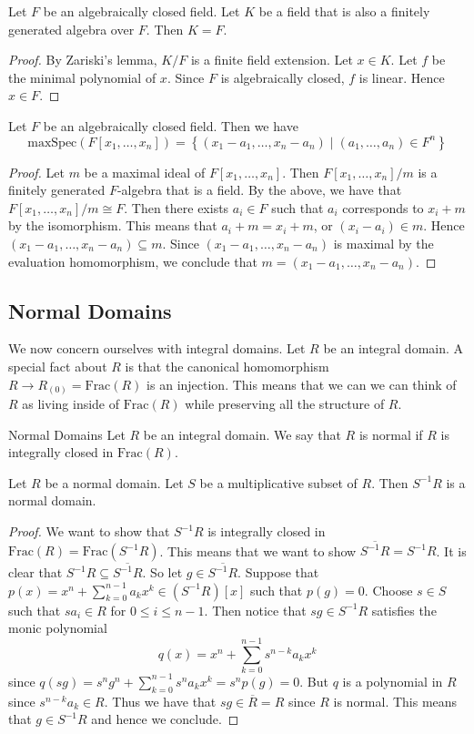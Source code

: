 \documentclass[a4paper]{article}
\begin{document}
\begin{crl}{}{} Let $F$ be an algebraically closed field. Let $K$ be a field that is also a finitely generated algebra over $F$. Then $K=F$. \tcbline
\begin{proof}
By Zariski's lemma, $K/F$ is a finite field extension. Let $x\in K$. Let $f$ be the minimal polynomial of $x$. Since $F$ is algebraically closed, $f$ is linear. Hence $x\in F$. 
\end{proof}
\end{crl}

\begin{crl}{}{} Let $F$ be an algebraically closed field. Then we have $$\text{maxSpec}(F[x_1,\dots,x_n])=\left\{(x_1-a_1,\dots,x_n-a_n)\;|\;(a_1,\dots,a_n)\in F^n\right\}$$ \tcbline
\begin{proof}
Let $m$ be a maximal ideal of $F[x_1,\dots,x_n]$. Then $F[x_1,\dots,x_n]/m$ is a finitely generated $F$-algebra that is a field. By the above, we have that $F[x_1,\dots,x_n]/m\cong F$. Then there exists $a_i\in F$ such that $a_i$ corresponds to $x_i+m$ by the isomorphism. This means that $a_i+m=x_i+m$, or $(x_i-a_i)\in m$. Hence $(x_1-a_1,\dots,x_n-a_n)\subseteq m$. Since $(x_1-a_1,\dots,x_n-a_n)$ is maximal by the evaluation homomorphism, we conclude that $m=(x_1-a_1,\dots,x_n-a_n)$. 
\end{proof}
\end{crl}

\subsection{Normal Domains}
We now concern ourselves with integral domains. Let $R$ be an integral domain. A special fact about $R$ is that the canonical homomorphism $R\to R_{(0)}=\text{Frac}(R)$ is an injection. This means that we can we can think of $R$ as living inside of $\text{Frac}(R)$ while preserving all the structure of $R$. 

\begin{defn}{Normal Domains}{} Let $R$ be an integral domain. We say that $R$ is normal if $R$ is integrally closed in $\text{Frac}(R)$. 
\end{defn}

\begin{prp}{}{} Let $R$ be a normal domain. Let $S$ be a multiplicative subset of $R$. Then $S^{-1}R$ is a normal domain. \tcbline
\begin{proof}
We want to show that $S^{-1}R$ is integrally closed in $\text{Frac}(R)=\text{Frac}(S^{-1}R)$. This means that we want to show $\overline{S^{-1}R}=S^{-1}R$. It is clear that $S^{-1}R\subseteq\overline{S^{-1}R}$. So let $g\in\overline{S^{-1}R}$. Suppose that $p(x)=x^n+\sum_{k=0}^{n-1}a_kx^k\in (S^{-1}R)[x]$ such that $p(g)=0$. Choose $s\in S$ such that $sa_i\in R$ for $0\leq i\leq n-1$. Then notice that $sg\in S^{-1}R$ satisfies the monic polynomial $$q(x)=x^n+\sum_{k=0}^{n-1}s^{n-k}a_kx^k$$ since $q(sg)=s^ng^n+\sum_{k=0}^{n-1}s^na_kx^k=s^np(g)=0$. But $q$ is a polynomial in $R$ since $s^{n-k}a_k\in R$. Thus we have that $sg\in\overline{R}=R$ since $R$ is normal. This means that $g\in S^{-1}R$ and hence we conclude. 
\end{proof}
\end{prp}
\end{document}
